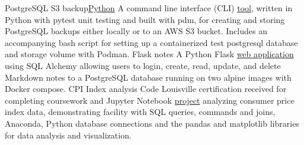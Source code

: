 \datedsubsection{}
{PostgreSQL S3 backup}{\href{https://github.com/JacobArchambault?tab=repositories&q=&type=&language=python&sort=}{Python}}
{A command line interface (CLI) \href{https://github.com/JacobArchambault/pgbackup}{tool}, written in Python with pytest unit testing and built with pdm, for creating and storing PostgreSQL backups either locally or to an AWS S3 bucket. Includes an accompanying bash script for setting up a containerized test postgresql database and storage volume with Podman.}
\datedsubsection{}
{Flask notes}{}
{A Python Flask \href{https://github.com/JacobArchambault/flask_notes}{web application} using SQL Alchemy allowing users to login, create, read, update, and delete Markdown notes to a PostgreSQL database running on two alpine images with Docker compose.}
\datedsubsection{}
{CPI Index analysis}{}
{Code Louisville certification received for completing coursework and Jupyter Notebook \href{https://github.com/jacobarchambault/cpi-python}{project} analyzing consumer price index data, demonstrating facility with SQL queries, commands and joins, Anaconda, Python database connections and the pandas and matplotlib libraries for data analysis and visualization.}
